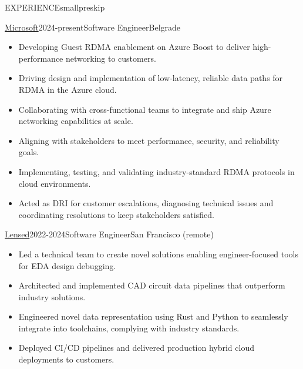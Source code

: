 \documentclass{resume}
\begin{document}
\begin{minipage}[t]{0.54\textwidth}

	\begin{rsection}{\MakeUppercase{experience}}{smallpreskip}
    	\begin{rcontent}[90pt]{\href{https://www.microsoft.com/}{Microsoft}}{2024-present}{Software Engineer}{Belgrade}
    	\begin{itemize}
            \item Developing Guest RDMA enablement on Azure Boost to deliver high-performance networking to customers.
            \item Driving design and implementation of low-latency, reliable data paths for RDMA in the Azure cloud.
            \item Collaborating with cross-functional teams to integrate and ship Azure networking capabilities at scale.
            \item Aligning with stakeholders to meet performance, security, and reliability goals.
            \item Implementing, testing, and validating industry-standard RDMA protocols in cloud environments.
            \item Acted as DRI for customer escalations, diagnosing technical issues and coordinating resolutions to keep stakeholders satisfied.
    	\end{itemize}
    	\end{rcontent}
        \divider
		\begin{rcontent}[90pt]{\href{https://lenseda.com/}{Lensed}}{2022-2024}{Software Engineer}{San Francisco (remote)}
		\begin{itemize}
			\item Led a technical team to create novel solutions enabling engineer-focused tools for EDA design debugging.
			\item Architected and implemented CAD circuit data pipelines that outperform industry solutions.
			\item Engineered novel data representation using Rust and Python to seamlessly integrate into toolchains, complying with industry standards.
			\item Deployed CI/CD pipelines and delivered production hybrid cloud deployments to customers.

\end{itemize}
\end{rcontent}
\end{rsection}
\end{minipage}
\end{document}
